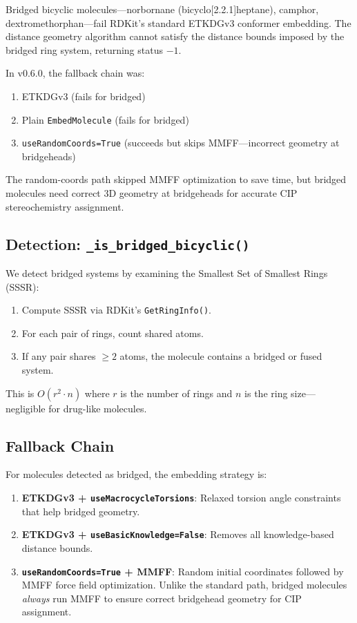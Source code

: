 \documentclass[11pt,a4paper]{article}
\begin{document}
Bridged bicyclic molecules---norbornane (bicyclo[2.2.1]heptane), camphor, dextromethorphan---fail RDKit's standard ETKDGv3 conformer embedding. The distance geometry algorithm cannot satisfy the distance bounds imposed by the bridged ring system, returning status $-1$.

In v0.6.0, the fallback chain was:
\begin{enumerate}
    \item ETKDGv3 (fails for bridged)
    \item Plain \texttt{EmbedMolecule} (fails for bridged)
    \item \texttt{useRandomCoords=True} (succeeds but skips MMFF---incorrect geometry at bridgeheads)
\end{enumerate}

The random-coords path skipped MMFF optimization to save time, but bridged molecules need correct 3D geometry at bridgeheads for accurate CIP stereochemistry assignment.

\subsection{Detection: \texttt{\_is\_bridged\_bicyclic()}}

We detect bridged systems by examining the Smallest Set of Smallest Rings (SSSR):

\begin{enumerate}[leftmargin=*]
    \item Compute SSSR via RDKit's \texttt{GetRingInfo()}.
    \item For each pair of rings, count shared atoms.
    \item If any pair shares $\geq 2$ atoms, the molecule contains a bridged or fused system.
\end{enumerate}

This is $O(r^2 \cdot n)$ where $r$ is the number of rings and $n$ is the ring size---negligible for drug-like molecules.

\subsection{Fallback Chain}

For molecules detected as bridged, the embedding strategy is:

\begin{enumerate}[leftmargin=*]
    \item \textbf{ETKDGv3 + \texttt{useMacrocycleTorsions}}: Relaxed torsion angle constraints that help bridged geometry.
    \item \textbf{ETKDGv3 + \texttt{useBasicKnowledge=False}}: Removes all knowledge-based distance bounds.
    \item \textbf{\texttt{useRandomCoords=True} + MMFF}: Random initial coordinates followed by MMFF force field optimization. Unlike the standard path, bridged molecules \emph{always} run MMFF to ensure correct bridgehead geometry for CIP assignment.
\end{enumerate}
\end{document}
